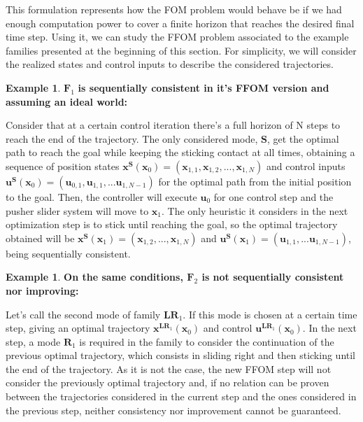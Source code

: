 \documentclass[12,twoside]{TFG-GM}
\theoremstyle{definition}
\newtheorem{example}[theorem]{Example}
\theoremstyle{remark}
\begin{document}
This formulation represents how the FOM problem would behave be if we had enough computation power to cover a finite horizon that reaches the desired final time step. Using it, we can study the FFOM problem associated to the example families presented at the beginning of this section. For simplicity, we will consider the realized states and control inputs to describe the considered trajectories.

\begin{example} \label{ex:f1consistent} $\textbf{F}_1$ \textbf{is sequentially consistent in it's FFOM version and assuming an ideal world:}

Consider that at a certain control iteration there's a full horizon of N steps to reach the end of the trajectory. The only considered mode, $\textbf{S}$, get the optimal path to reach the goal while keeping the sticking contact at all times, obtaining a sequence of position states $\textbf{x}^{\textbf{S}}(\textbf{x}_0) = (\textbf{x}_{1,1}, \textbf{x}_{1,2}, ..., \textbf{x}_{1,N})$ and control inputs $\textbf{u}^{\textbf{S}}(\textbf{x}_0) = (\textbf{u}_{0,1}, \textbf{u}_{1,1}, ... \textbf{u}_{1,N-1})$ for the optimal path from the initial position to the goal. Then, the controller will execute $\textbf{u}_0$ for one control step and the pusher slider system will move to $\textbf{x}_1$. The only heuristic it considers in the next optimization step is to stick until reaching the goal, so the optimal trajectory obtained will be $\textbf{x}^{\textbf{S}}(\textbf{x}_1) = (\textbf{x}_{1,2}, ..., \textbf{x}_{1,N})$ and $\textbf{u}^{\textbf{S}}(\textbf{x}_1) = (\textbf{u}_{1,1}, ... \textbf{u}_{1,N-1})$, being sequentially consistent.
\end{example}
\begin{example} \label{ex:f2notconsistent} \textbf{On the same conditions, $\textbf{F}_2$ is not sequentially consistent nor improving:}

Let's call the second mode of family $\textbf{LR}_1$. If this mode is chosen at a certain time step, giving an optimal trajectory $\textbf{x}^{\textbf{LR}_1}(\textbf{x}_0)$ and control $\textbf{u}^{\textbf{LR}_1}(\textbf{x}_0)$. In the next step, a mode $\textbf{R}_1$ is required in the family to consider the continuation of the previous optimal trajectory, which consists in sliding right and then sticking until the end of the trajectory. As it is not the case, the new FFOM step will not consider the previously optimal trajectory and, if no relation can be proven between the trajectories considered in the current step and the ones considered in the previous step, neither consistency nor improvement cannot be guaranteed.
\end{example}
\end{document}
